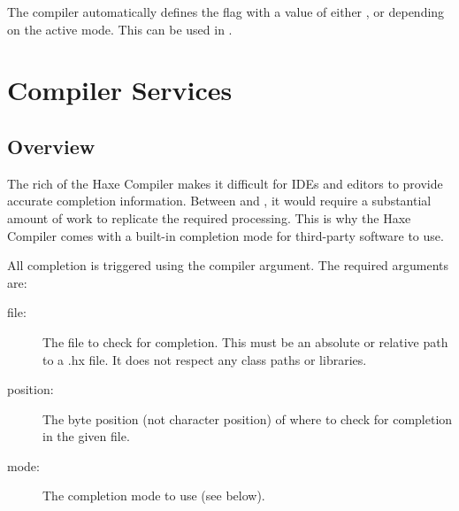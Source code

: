 The compiler automatically defines the flag  with a value of either ,  or  depending on the active mode. This can be used in .






\section{Compiler Services}
\label{cr-completion}

\subsection{Overview}
\label{cr-completion-overview}

The rich  of the Haxe Compiler makes it difficult for IDEs and editors to provide accurate completion information. Between  and , it would require a substantial amount of work to replicate the required processing. This is why the Haxe Compiler comes with a built-in completion mode for third-party software to use.

All completion is triggered using the  compiler argument. The required arguments are:

\begin{description}
	\item[file:] The file to check for completion. This must be an absolute or relative path to a .hx file. It does not respect any class paths or libraries.
	\item[position:] The byte position (not character position) of where to check for completion in the given file.
	\item[mode:] The completion mode to use (see below).
\end{description}

